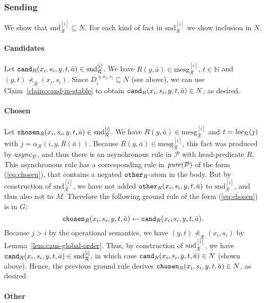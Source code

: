 \documentclass{tlp}
\newcommand{\Nat}{\mathbb{N}}  \newcommand{\len}[1]{|#1|} \newcommand{\rom}[1]{\text{\emph{(#1)}}} \newcommand{\romI}{\rom i}
\newcommand{\ded}{\mathcal{P}}
\newcommand{\addlt}[3]{#1^{\Uparrow#2,#3}}
\newcommand{\chosen}{\pred{chosen}}
\newcommand{\other}{\pred{other}}
\newcommand{\cand}{\pred{cand}}
\newcommand{\pure}[1]{\fname{pure}(#1)}
\newcommand{\run}{\mathcal{R}}
\newcommand{\async}[1]{\fname{async}_{#1}}
\newcommand{\locR}[1]{\fname{loc}_{\run}(#1)}
\newcommand{\arr}{\alpha_{\run}}
\newcommand{\slicesnd}[1]{\text{snd}_{\run}^{[#1]}}
\newcommand{\mesg}[1]{\mathrm{mesg}_{\run}^{[#1]}}
\newcommand{\caus}{\prec_{\run}}
\newcommand{\grded}{G}
\begin{document}
\begin{appendix}
\subsubsection{Sending}

We show that $\slicesnd i\subseteq N$. For each kind of fact in $\slicesnd i$
we show inclusion in $N$.


\paragraph*{Candidates}

Let $\cand_{R}(x_{i},s_{i},y,t,\bar{a})\in\slicesnd i$. We have $R(y,\bar{a})\in\mesg i$,
$t\in\Nat$ and $(y,t)\not\caus(x_{i},s_{i})$. Since $\addlt{D_{i}}{x_{i}}{s_{i}}\subseteq N$
(see above), we can use Claim~\ref{claim:cand-in-stable} to obtain
$\cand_{R}(x_{i},s_{i},y,t,\bar{a})\in N$, as desired.




\paragraph*{Chosen}

Let $\chosen_{R}(x_{i},s_{i},y,t,\bar{a})\in\slicesnd i$. We have
$R(y,\bar{a})\in\mesg i$ and $t=\locR j$ with $j=\arr(i,y,R(\bar{a}))$.
Because $R(y,\bar{a})\in\mesg i$, this fact was produced by $\async{\ded}$,
and thus there is an asynchronous rule in $\ded$ with head-predicate
$R$. This asynchronous rule has a corresponding rule in $\pure{\ded}$
of the form (\ref{eq:chosen}), that contains a negated $\other_{R}$-atom
in the body. But by construction of $\slicesnd i$, we have not added
$\other_{R}(x_{i},s_{i},y,t,\bar{a})$ to $\slicesnd i$, and thus
also not to $M$. Therefore the following ground rule of the form
(\ref{eq:chosen}) is in $\grded$:
\[
\chosen_{R}(x_{i},s_{i},y,t,\bar{a})\gets\cand_{R}(x_{i},s_{i},y,t,\bar{a}).
\]
Because $j>i$ by the operational semantics, we have $(y,t)\not\caus(x_{i},s_{i})$
by Lemma~\ref{lem:caus-global-order}. Thus, by construction of $\slicesnd i$,
we have $\cand_{R}(x_{i},s_{i},y,t,\bar{a})\in\slicesnd i$, in which
case $\cand_{R}(x_{i},s_{i},y,t,\bar{a})\in N$ (shown above). Hence,
the previous ground rule derives $\chosen_{R}(x_{i},s_{i},y,t,\bar{a})\in N$,
as desired.




\paragraph*{Other}


\end{appendix}
\end{document}
